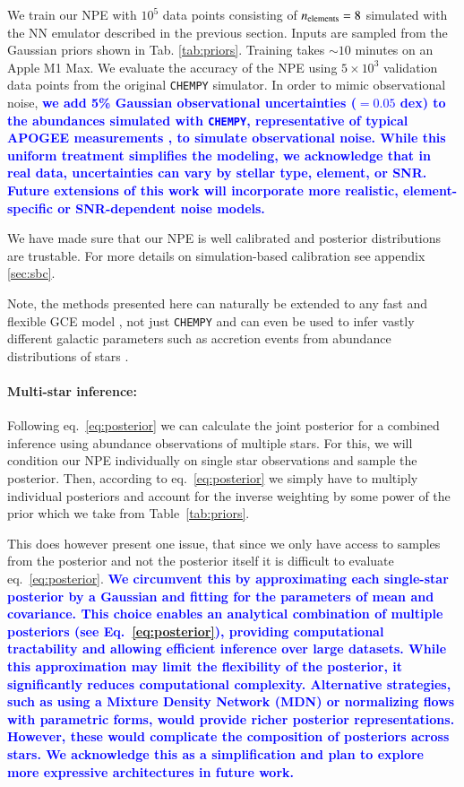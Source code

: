 \documentclass{aa}
\newcommand{\resub}[1]{\textbf{\textcolor{blue}{#1}}}
\begin{document}
We train our NPE with $10^5$ data points consisting of $n_{\rm elements}=8$ simulated with the NN emulator described in the previous section. Inputs are sampled from the Gaussian priors shown in Tab. \ref{tab:priors}. Training takes $\sim10$ minutes on an Apple M1 Max.
We evaluate the accuracy of the NPE using $5\times10^3$ validation data points from the original \texttt{CHEMPY} simulator. In order to mimic observational noise, \resub{we add 5\%  Gaussian observational uncertainties ($=0.05$ dex) to the abundances simulated with \texttt{CHEMPY}, representative of typical APOGEE measurements \citep{apogee17}, to simulate observational noise. While this uniform treatment simplifies the modeling, we acknowledge that in real data, uncertainties can vary by stellar type, element, or SNR. Future extensions of this work will incorporate more realistic, element-specific or SNR-dependent noise models.}

We have made sure that our NPE is well calibrated and posterior distributions are trustable. For more details on simulation-based calibration see appendix \ref{sec:sbc}.

Note, the methods presented here can naturally be extended to any fast and flexible GCE model \citep[e.g.][and others]{Talbot1971,vice,omega2018}, not just \texttt{CHEMPY} and can even be used to infer vastly different galactic parameters such as accretion events from abundance distributions of stars \citep[e.g.][]{Viterbo2024}.


\paragraph{Multi-star inference:}
Following eq.~\ref{eq:posterior} we can calculate the joint posterior for a combined inference using abundance observations of multiple stars. For this, we will condition our NPE individually on single star observations and sample the posterior. Then, according to eq.~\ref{eq:posterior} we simply have to multiply individual posteriors and account for the inverse weighting by some power of the prior which we take from Table~\ref{tab:priors}. 

This does however present one issue, that since we only have access to samples from the posterior and not the posterior itself it is difficult to evaluate eq.~\ref{eq:posterior}. \resub{We circumvent this by approximating each single-star posterior by a Gaussian and fitting for the parameters of mean and covariance. This choice enables an analytical combination of multiple posteriors (see Eq.~\ref{eq:posterior}), providing computational tractability and allowing efficient inference over large datasets. While this approximation may limit the flexibility of the posterior, it significantly reduces computational complexity. Alternative strategies, such as using a Mixture Density Network (MDN) or normalizing flows with parametric forms, would provide richer posterior representations. However, these would complicate the composition of posteriors across stars. We acknowledge this as a simplification and plan to explore more expressive architectures in future work.} 
\end{document}

